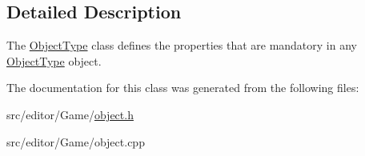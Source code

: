 \subsection{\-Detailed \-Description}
\-The \hyperlink{class_object_type}{\-Object\-Type} class defines the properties that are mandatory in any \hyperlink{class_object_type}{\-Object\-Type} object. 

\-The documentation for this class was generated from the following files\-:\begin{DoxyCompactItemize}
\item 
src/editor/\-Game/\hyperlink{object_8h}{object.\-h}\item 
src/editor/\-Game/object.\-cpp\end{DoxyCompactItemize}
